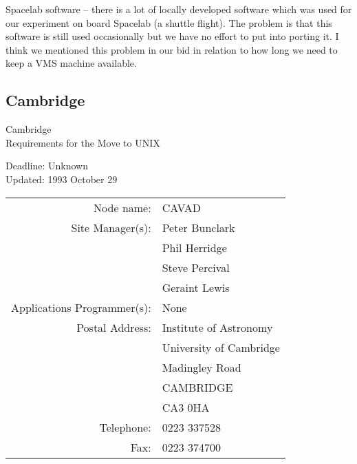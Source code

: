 Spacelab software -- there is a lot of locally developed software which was
used for our experiment on board Spacelab (a shuttle flight).
The problem is that this software is still used occasionally but we have no
effort to put into porting it.
I think we mentioned this problem in our bid in relation to how long we need
to keep a VMS machine available.


\newpage
\subsection{Cambridge}

\renewcommand{\starsitename}{Cambridge}
\renewcommand{\starnodename}{CAVAD}

\renewcommand{\starunixdate}{Unknown}
\renewcommand{\starupdate}{1993 October 29}

\renewcommand{\starsitetelephone}{0223 337528}
\renewcommand{\starsitefax}{0223 374700}

\begin{center}
{\Large\sc \starsitename \\ [2ex]
           Requirements for the Move to UNIX}

\vspace{3mm}
{\large\sc Deadline: \starunixdate \\ [1ex]
           Updated: \starupdate}
\end{center}

\vspace{5mm}

\begin{center}
\begin{tabular}{rl}
{\sc Node name:}                  & \starnodename \\
{\sc Site Manager(s):}            & Peter Bunclark \\
                                  & Phil Herridge \\
                                  & Steve Percival \\
                                  & Geraint Lewis \\
{\sc Applications Programmer(s):} & None \\
{\sc Postal Address:}             & Institute of Astronomy \\
                                  & University of Cambridge \\
                                  & Madingley Road \\
                                  & CAMBRIDGE \\
                                  & CA3 0HA \\
{\sc Telephone:}                  & \starsitetelephone \\
{\sc Fax:}                        & \starsitefax \\
\end{tabular}
\end{center}


